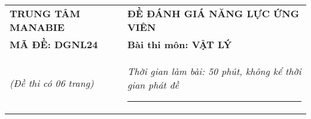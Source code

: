 \begin{center}
	\begin{tabular}{M{6.5cm}M{11cm}}
		\textbf{TRUNG TÂM MANABIE}& \textbf{ĐỀ ĐÁNH GIÁ NĂNG LỰC ỨNG VIÊN}\\
		\textbf{MÃ ĐỀ: DGNL24}& \textbf{Bài thi môn: VẬT LÝ}\\
		\textit{(Đề thi có 06 trang)}& \textit{Thời gian làm bài: 50 phút, không kể thời gian phát đề}
		
		\noindent\rule{2cm}{0.8pt} \\
	\end{tabular}
\end{center}
\setcounter{section}{0}
\section{}
\section{}
\section{}
